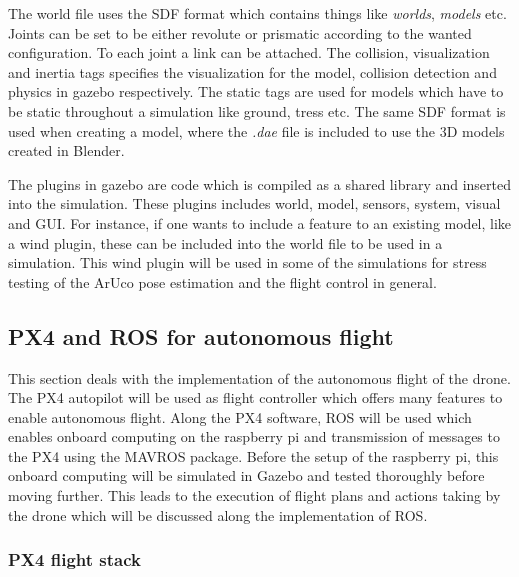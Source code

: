 \documentclass[../Head/report.tex]{subfiles}
\begin{document}
The world file uses the SDF format which contains things like \textit{worlds}, \textit{models} etc. Joints can be set to be either revolute or prismatic according to the wanted configuration. To each joint a link can be attached. The collision, visualization and inertia tags specifies the visualization for the model, collision detection and physics in gazebo respectively. The static tags are used for models which have to be static throughout a simulation like ground, tress etc. The same SDF format is used when creating a model, where the \textit{.dae} file is included to use the 3D models created in Blender.  

The plugins in gazebo are code which is compiled as a shared library and inserted into the simulation. These plugins includes world, model, sensors, system, visual and GUI. For instance, if one wants to include a feature to an existing model, like a wind plugin, these can be included into the world file to be used in a simulation. This wind plugin will be used in some of the simulations for stress testing of the ArUco pose estimation and the flight control in general. 

\subsection{PX4 and ROS for autonomous flight}

This section deals with the implementation of the autonomous flight of the drone. The PX4 autopilot will be used as flight controller which offers many features to enable autonomous flight. Along the PX4 software, ROS will be used which enables onboard computing on the raspberry pi and transmission of messages to the PX4 using the MAVROS package. Before the setup of the raspberry pi, this onboard computing will be simulated in Gazebo and tested thoroughly before moving further. This leads to the execution of flight plans and actions taking by the drone which will be discussed along the implementation of ROS. 

\subsubsection{PX4 flight stack}
\label{sec:px4_flight_stack}

\end{document}
